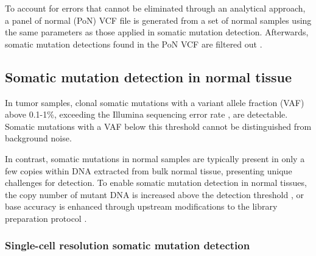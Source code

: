To account for errors that cannot be eliminated through an analytical approach, a panel of normal (PoN) VCF file is generated from a set of normal samples using the same parameters as those applied in somatic mutation detection. Afterwards, somatic mutation detections found in the PoN VCF are filtered out \cite{Cibulskis2013-gw}.

\subsection{Somatic mutation detection in normal tissue}
\label{sec:somatic_mutation_detection_in_normal_tissue}

In tumor samples, clonal somatic mutations with a variant allele fraction (VAF) above 0.1-1\%, exceeding the Illumina sequencing error rate \cite{Cibulskis2013-gw}, are detectable. Somatic mutations with a VAF below this threshold cannot be distinguished from background noise.

In contrast, somatic mutations in normal samples are typically present in only a few copies within DNA extracted from bulk normal tissue, presenting unique challenges for detection. To enable somatic mutation detection in normal tissues, the copy number of mutant DNA is increased above the detection threshold \cite{Lee-Six2018-qe}, or base accuracy is enhanced through upstream modifications to the library preparation protocol \cite{Schmitt2012-yr, Hoang2016-jx, Abascal2021-pk}.

\subsubsection{Single-cell resolution somatic mutation detection}

